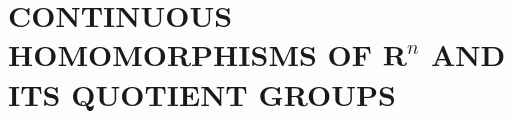 \section{\texorpdfstring{CONTINUOUS HOMOMORPHISMS OF \(\mathbf{R}^n\) AND ITS QUOTIENT GROUPS}{CONTINUOUS HOMOMORPHISMS OF R TO THE N AND ITS QUOTIENT GROUPS}}

